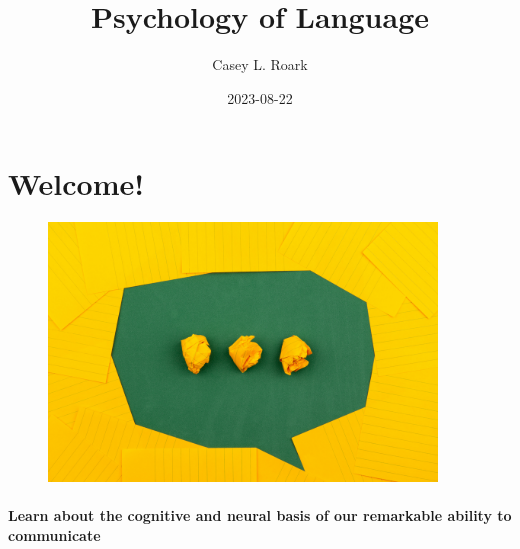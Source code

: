 \documentclass[
  letterpaper,
  DIV=11,
  numbers=noendperiod]{scrreprt}
\title{Psychology of Language}
\author{Casey L. Roark}
\date{2023-08-22}
\renewcommand*\contentsname{Table of contents}
\newcommand\contentsname{Table of contents}
\begin{document}
\maketitle
\ifdefined\Shaded\renewenvironment{Shaded}{\begin{tcolorbox}[sharp corners, breakable, frame hidden, boxrule=0pt, borderline west={3pt}{0pt}{shadecolor}, enhanced, interior hidden]}{\end{tcolorbox}}\fi

\renewcommand*\contentsname{Table of contents}
{
\hypersetup{linkcolor=}
\setcounter{tocdepth}{2}
\tableofcontents
}

\hypertarget{welcome}{%
\chapter*{Welcome!}\label{welcome}}


\begin{figure}

{\centering \includegraphics[width=4.0625in,height=\textheight]{images/volodymyr-hryshchenko-V5vqWC9gyEU-unsplash.jpg}

}

\end{figure}

\hypertarget{learn-about-the-cognitive-and-neural-basis-of-our-remarkable-ability-to-communicate}{%
\subsubsection*{Learn about the cognitive and neural basis of our
remarkable ability to
communicate}\label{learn-about-the-cognitive-and-neural-basis-of-our-remarkable-ability-to-communicate}}
\end{document}
